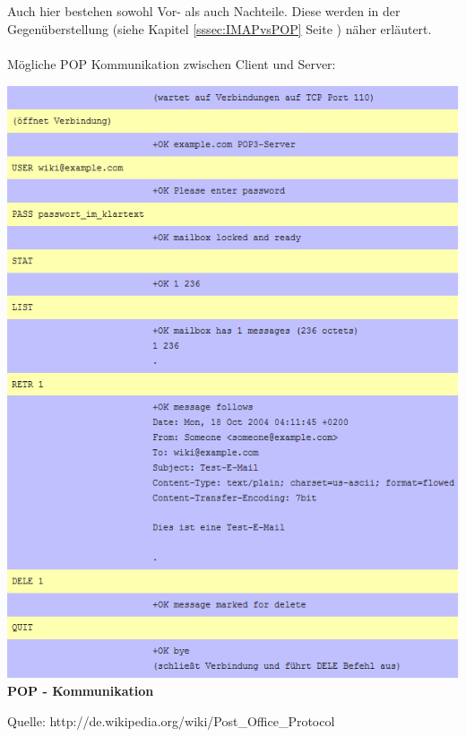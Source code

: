 \documentclass[12pt,a4paper]{report}
\begin{document}
\begin{onehalfspace}
Auch hier bestehen sowohl Vor- als auch Nachteile. Diese werden in der Gegenüberstellung (siehe Kapitel \ref{sssec:IMAPvsPOP} Seite \pageref{sssec:IMAPvsPOP}) näher erläutert.\\\\
Mögliche POP Kommunikation zwischen Client und Server:\\
\begin{center}
\includegraphics[scale=0.7]{../docs/lyaton/graphics/POP-Kommunikation.png}\\
\textbf{POP - Kommunikation\\}
\begin{scriptsize}
Quelle: http://de.wikipedia.org/wiki/Post\_Office\_Protocol
\end{scriptsize}
\end{center}


\end{onehalfspace}
\end{document}
